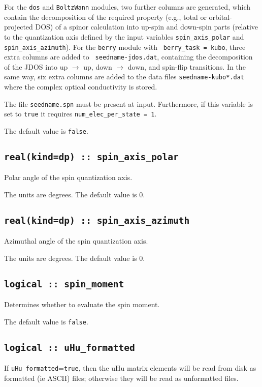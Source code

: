 For the {\tt dos} and {\tt BoltzWann} modules, two further columns are
generated, which contain the decomposition of the required property
(e.g., total or orbital-projected DOS) of a spinor calculation into
up-spin and down-spin parts (relative to the quantization axis defined
by the input variables {\tt spin\_axis\_polar} and {\tt
  spin\_axis\_azimuth}).  For the {\tt berry} module with {\tt
  berry\_task = kubo}, three extra columns are added to {\tt
  seedname-jdos.dat}, containing the decomposition of the JDOS into up
$\rightarrow$ up, down $\rightarrow$ down, and spin-flip
transitions. In the same way, six extra columns are added to the data
files {\tt seedname-kubo*.dat} where the complex optical conductivity
is stored.

The file {\tt seedname.spn} must be present at input. Furthermore, if
this variable is set to \verb#true# it
requires {\tt num\_elec\_per\_state = 1}.

The default value is \verb#false#.

  \subsection{\tt real(kind=dp) :: spin\_axis\_polar}
Polar angle of the spin quantization axis.

The units are degrees. The default value is 0.

\subsection{\tt real(kind=dp) :: spin\_axis\_azimuth}
Azimuthal angle of the spin quantization axis. 

The units are degrees. The default value is 0.

\subsection[spin\_moment]{\tt logical :: spin\_moment}
Determines whether to evaluate the spin moment.

The default value is \verb#false#.

\subsection[uHu\_formatted]{\tt logical :: uHu\_formatted}

If \verb#uHu_formatted#=\verb#true#, then the uHu matrix elements will be
read from disk as formatted (ie ASCII) files; otherwise they will be
read as unformatted files.

